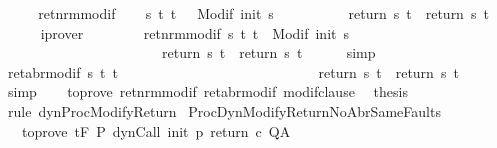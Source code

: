 \begin{isabellebody}
%
\isadelimproof
%
\endisadelimproof
%
\isatagproof
{}\isamarkupfalse%
\ {\isacharminus}\isanewline
\ \ \isamarkupfalse%
\ ret{\isacharunderscore}nrm{\isacharunderscore}modif\isanewline
\ \ \isamarkupfalse%
\ {\isachardoublequoteopen}{\isasymforall}s\ t{\isachardot}\ t\ \ {\isasymin}\ {\isacharparenleft}Modif\ {\isacharparenleft}init\ s{\isacharparenright}{\isacharparenright}\ \isanewline
\ \ \ \ \ \ \ \ {\isasymlongrightarrow}\ return{\isacharprime}\ s\ t\ {\isacharequal}\ return\ s\ t{\isachardoublequoteclose}\isanewline
\ \ \ \ \isamarkupfalse%
\ iprover\isanewline
\ \ \isamarkupfalse%
\ \isanewline
\ \ \isamarkupfalse%
\ ret{\isacharunderscore}nrm{\isacharunderscore}modif{\isacharprime}{\isacharcolon}\ {\isachardoublequoteopen}{\isasymforall}s\ t{\isachardot}\ t\ {\isasymin}\ {\isacharparenleft}Modif\ {\isacharparenleft}init\ s{\isacharparenright}{\isacharparenright}\ \isanewline
\ \ \ \ \ \ \ \ \ \ \ \ \ \ \ \ \ \ \ \ \ \ {\isasymlongrightarrow}\ return{\isacharprime}\ s\ t\ {\isacharequal}\ return\ s\ t{\isachardoublequoteclose}\isanewline
\ \ \ \ \isamarkupfalse%
\ simp\isanewline
\ \ \isamarkupfalse%
\ ret{\isacharunderscore}abr{\isacharunderscore}modif{\isacharprime}{\isacharcolon}\ {\isachardoublequoteopen}{\isasymforall}s\ t{\isachardot}\ t\ {\isasymin}\ {\isacharbraceleft}{\isacharbraceright}\ \isanewline
\ \ \ \ \ \ \ \ \ \ \ \ \ \ \ \ \ \ \ \ \ \ \ \ {\isasymlongrightarrow}\ return{\isacharprime}\ s\ t\ {\isacharequal}\ return\ s\ t{\isachardoublequoteclose}\isanewline
\ \ \ \ \isamarkupfalse%
\ simp\isanewline
\ \ \isamarkupfalse%
\ to{\isacharunderscore}prove\ ret{\isacharunderscore}nrm{\isacharunderscore}modif{\isacharprime}\ ret{\isacharunderscore}abr{\isacharunderscore}modif{\isacharprime}\ modif{\isacharunderscore}clause\ \isamarkupfalse%
\ {\isacharquery}thesis\isanewline
\ \ \ \ \isamarkupfalse%
\ {\isacharparenleft}rule\ dynProcModifyReturn{\isacharparenright}\isanewline
{}\isamarkupfalse%
%
\endisatagproof
{\isafoldproof}%
%
\isadelimproof
\isanewline
%
\endisadelimproof
\isanewline
{}\isamarkupfalse%
\ ProcDynModifyReturnNoAbrSameFaults{\isacharcolon}\ \isanewline
\ \ \ to{\isacharunderscore}prove{\isacharcolon}\ {\isachardoublequoteopen}{\isasymGamma}{\isacharcomma}{\isasymTheta}{\isasymturnstile}\isactrlsub t\isactrlbsub {\isacharslash}F\isactrlesub \ P\ {\isacharparenleft}dynCall\ init\ p\ return{\isacharprime}\ c{\isacharparenright}\ Q{\isacharcomma}A{\isachardoublequoteclose}\isanewline

\end{isabellebody}
